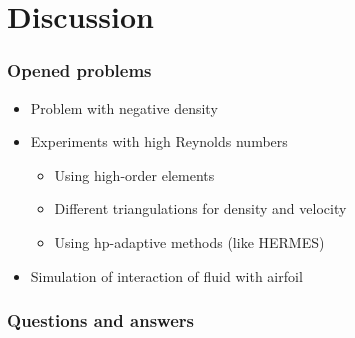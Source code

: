 \documentclass{beamer}
\begin{document}
\section{Discussion}

\frame
{
	\frametitle{Opened problems}
	\begin{itemize}
    	\item Problem with negative density
    	\pause
    	\item Experiments with high Reynolds numbers
		\begin{itemize}
			\item Using high-order elements
			\item Different triangulations for density and velocity
			\item Using hp-adaptive methods (like HERMES)
		\end{itemize} 
    	\pause
    	\item Simulation of interaction of fluid with airfoil
	\end{itemize}
}

\frame
{
	\frametitle{Questions and answers}
}
\end{document}
